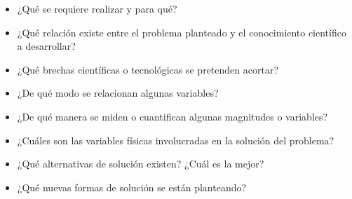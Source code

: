 \begin{itemize}
	\item ¿Qué se requiere realizar y para qué?
	\item ¿Qué relación existe entre el problema planteado y el conocimiento científico a desarrollar?
	\item ¿Qué brechas científicas o tecnológicas se pretenden acortar?
	\item ¿De qué modo se relacionan algunas variables?
	\item	¿De qué manera se miden o cuantifican algunas magnitudes o variables?
	\item ¿Cuáles son las variables físicas involucradas en la solución del problema? 
	\item ¿Qué alternativas de solución existen? ¿Cuál es la mejor? 
	\item ¿Qué nuevas formas de solución se están planteando?
\end{itemize}